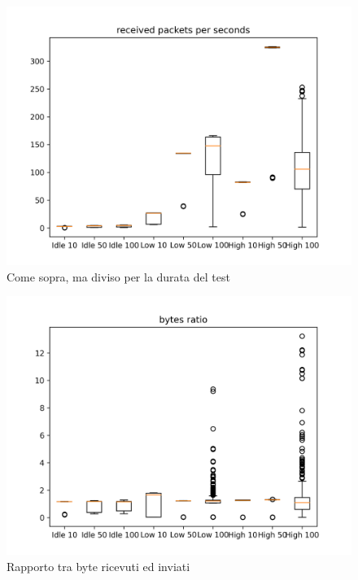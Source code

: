 \documentclass[12pt, a4paper]{article}
\begin{document}
\begin{figure}[H]
    \includegraphics[width=\linewidth, height=0.4\textheight, keepaspectratio]{graphs/received packets per seconds.png}
    \caption{Come sopra, ma diviso per la durata del test}
    \label{fig:rpps}
\end{figure}

\begin{figure}[H]
    \includegraphics[width=\linewidth, height=0.4\textheight, keepaspectratio]{graphs/bytes ratio.png}
    \caption{Rapporto tra byte ricevuti ed inviati}
    \label{fig:br}
\end{figure}
\end{document}

